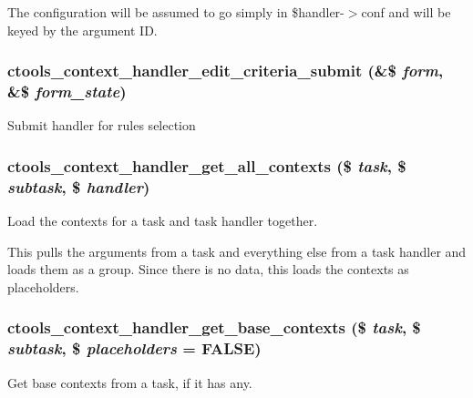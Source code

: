 The configuration will be assumed to go simply in \$handler-\/$>$conf and will be keyed by the argument ID. \hypertarget{context-task-handler_8inc_ad1a52d2b414d864cf1928eb23e5e9f26}{
\subsubsection[{ctools\_\-context\_\-handler\_\-edit\_\-criteria\_\-submit}]{\setlength{\rightskip}{0pt plus 5cm}ctools\_\-context\_\-handler\_\-edit\_\-criteria\_\-submit (\&\$ {\em form}, \/  \&\$ {\em form\_\-state})}}
\label{context-task-handler_8inc_ad1a52d2b414d864cf1928eb23e5e9f26}
Submit handler for rules selection \hypertarget{context-task-handler_8inc_af70804eb84ffd6c2b040857ac0afe103}{
\subsubsection[{ctools\_\-context\_\-handler\_\-get\_\-all\_\-contexts}]{\setlength{\rightskip}{0pt plus 5cm}ctools\_\-context\_\-handler\_\-get\_\-all\_\-contexts (\$ {\em task}, \/  \$ {\em subtask}, \/  \$ {\em handler})}}
\label{context-task-handler_8inc_af70804eb84ffd6c2b040857ac0afe103}
Load the contexts for a task and task handler together.

This pulls the arguments from a task and everything else from a task handler and loads them as a group. Since there is no data, this loads the contexts as placeholders. \hypertarget{context-task-handler_8inc_a380211d538fb41398e95489c3cbb71d3}{
\subsubsection[{ctools\_\-context\_\-handler\_\-get\_\-base\_\-contexts}]{\setlength{\rightskip}{0pt plus 5cm}ctools\_\-context\_\-handler\_\-get\_\-base\_\-contexts (\$ {\em task}, \/  \$ {\em subtask}, \/  \$ {\em placeholders} = {\ttfamily FALSE})}}
\label{context-task-handler_8inc_a380211d538fb41398e95489c3cbb71d3}
Get base contexts from a task, if it has any.


